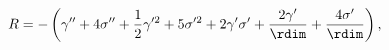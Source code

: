 \begin{equation}
\label{eq:ricci}
R=-\left(\gamma'' + 4 \sigma'' + \frac{1}{2} \gamma'^2 + 5
\sigma'^2 + 2 \gamma ' \sigma' + \frac{2
\gamma'}{\rdim} + \frac{4 \sigma'}{\rdim}\right),
\end{equation}

